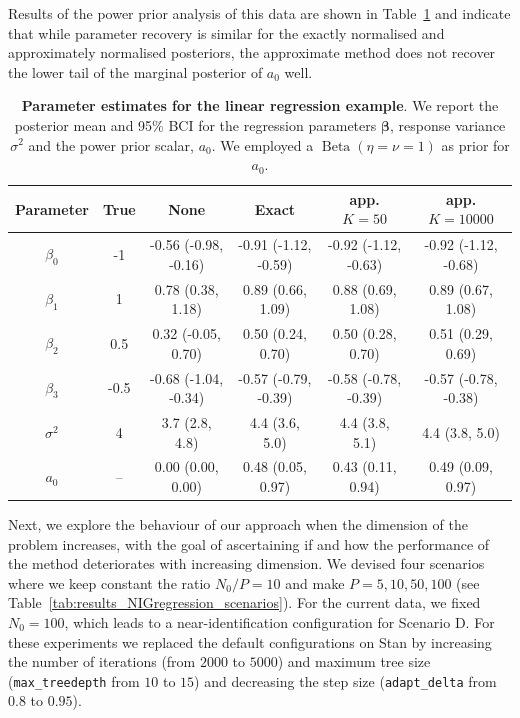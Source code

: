 \documentclass[a4paper, notitlepage, 11pt]{article}
\begin{document}
Results of the power prior analysis of this data are shown in Table~\ref{tab:results_NIGregression} and indicate that while parameter recovery is similar for the exactly normalised and approximately normalised posteriors, the approximate method does not recover the lower tail of the marginal posterior of $a_0$ well.
\begin{table}[!ht]
\label{tab:results_NIGregression}
\caption{\textbf{Parameter estimates for the linear regression example}.
We report the posterior mean and 95\% BCI for the regression parameters $\boldsymbol\beta$, response variance $\sigma^2$ and the power prior scalar, $a_0$.
We employed a  $\operatorname{Beta}(\eta = \nu = 1)$ as prior for $a_0$.
}
{\small
\begin{tabular}{cccccc}
\hline 
 Parameter & True & None & Exact & app. $K = 50$ & app. $K = 10000$ \\
 \hline
$\beta_0$ & -1 & -0.56 (-0.98, -0.16) & -0.91 (-1.12, -0.59) & -0.92 (-1.12, -0.63) & -0.92 (-1.12, -0.68) \\
$\beta_1$ & 1 & 0.78 (0.38, 1.18) & 0.89 (0.66, 1.09) & 0.88 (0.69, 1.08) & 0.89 (0.67, 1.08) \\
$\beta_2$ & 0.5 & 0.32 (-0.05, 0.70) & 0.50 (0.24, 0.70) & 0.50 (0.28, 0.70) & 0.51 (0.29, 0.69) \\
$\beta_3$ & -0.5 & -0.68 (-1.04, -0.34) & -0.57 (-0.79, -0.39) & -0.58 (-0.78, -0.39) & -0.57 (-0.78, -0.38) \\
$\sigma^2$ & 4 & 3.7 (2.8, 4.8) & 4.4 (3.6, 5.0) & 4.4 (3.8, 5.1) & 4.4 (3.8, 5.0) \\
$a_0$ & -- & 0.00 (0.00, 0.00) & 0.48 (0.05, 0.97) &0.43 (0.11, 0.94) & 0.49 (0.09, 0.97)\\
\hline
\end{tabular}
}
\end{table}

Next, we explore the behaviour of our approach when the dimension of the problem increases, with the goal of ascertaining if and how the performance of the method deteriorates with increasing dimension.
We devised four scenarios where we keep constant the ratio $N_0/P = 10$ and make $P = 5, 10, 50, 100$ (see Table~\ref{tab:results_NIGregression_scenarios}).
For the current data, we fixed $N_0 = 100$, which leads to a near-identification configuration for Scenario D.
For these experiments we replaced the default configurations on Stan by increasing the number of iterations (from $2000$ to $5000$) and maximum tree size (\verb|max_treedepth| from $10$ to $15$) and decreasing the step size (\verb|adapt_delta| from $0.8$ to $0.95$).
\end{document}
